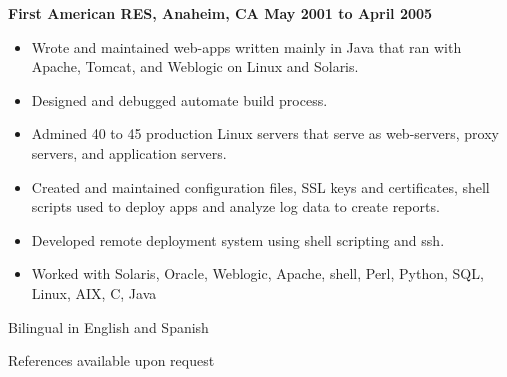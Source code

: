 \documentclass{res}
\begin{document}
\begin{resume}
{\large \bf First American RES, Anaheim, CA \hfill May 2001 to April 2005}
\begin{itemize}
\item Wrote and maintained web-apps written mainly in Java that ran
with Apache, Tomcat, and Weblogic on Linux and Solaris.
\item Designed and debugged automate build process.
\item Admined 40 to 45 production Linux servers that serve as
web-servers, proxy servers, and application servers.
\item Created and maintained configuration files,
SSL keys and certificates, shell scripts used to deploy apps and
analyze log data to create reports.
\item Developed remote deployment system using shell scripting and
ssh.
\item  Worked with Solaris, Oracle, Weblogic, Apache, shell, Perl, Python,
SQL, Linux, AIX, C, Java
\end{itemize}


Bilingual in English and Spanish

References available upon request

\end{resume}
\end{document}
